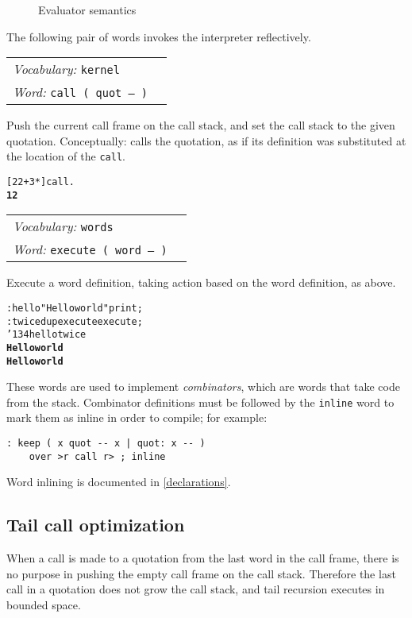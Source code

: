 \documentclass{book}
\newcommand{\bs}{\char'134}
\newcommand{\vocabulary}[1]{\emph{Vocabulary:} \texttt{#1}&\\}
\newcommand{\ordinaryword}[2]{\index{\texttt{#1}}\emph{Word:} \texttt{#2}&\\}
\newcommand{\wordtable}[1]{


\begin{tabularx}{12cm}{lX}
\hline
#1
\hline
\end{tabularx}

}
\begin{document}
\begin{figure}
\caption{Evaluator semantics}
\begin{center}
\end{center}
\end{figure}
The following pair of words invokes the interpreter reflectively.

\wordtable{
\vocabulary{kernel}
\ordinaryword{call}{call ( quot -- )}
}
Push the current call frame on the call stack, and set the call stack to the given quotation. Conceptually: calls the quotation, as if its definition was substituted at the location of the \texttt{call}.
\begin{alltt}
  [ 2 2 + 3 * ] call .
\textbf{12}
\end{alltt}
\wordtable{
\vocabulary{words}
\ordinaryword{execute}{execute ( word -- )}
}
Execute a word definition, taking action based on the word definition, as above.
\begin{alltt}
  : hello "Hello world" print ;
  : twice dup execute execute ;
  \bs hello twice
\textbf{Hello world}
\textbf{Hello world}
\end{alltt}

These words are used to implement \emph{combinators}, which are words that take code from the stack. Combinator definitions must be followed by the \texttt{inline} word to mark them as inline in order to compile; for example:
\begin{verbatim}
: keep ( x quot -- x | quot: x -- )
    over >r call r> ; inline
\end{verbatim}
Word inlining is documented in \ref{declarations}.

\subsection{Tail call optimization}

\newcommand{\tailglos}{\glossary{
name=tail call,
description=the last call in a quotation}
\glossary{
name=tail call optimization,
description=the elimination of call stack pushes when making a tail call}}

When a call is made to a quotation from the last word in the call frame, there is no
purpose in pushing the empty call frame on the call stack. Therefore the last call in a quotation does not grow the call stack, and tail recursion executes in bounded space.
\end{document}
